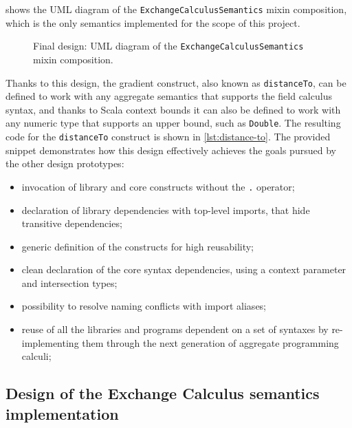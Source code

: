  shows the \ac{UML} diagram of the \texttt{ExchangeCalculusSemantics} mixin composition, which is the only semantics implemented for the scope of this project.

\begin{figure}
    \centering
    \caption{Final design: \ac{UML} diagram of the \texttt{ExchangeCalculusSemantics} mixin composition.}
    \label{fig:final-design-exchange-calculus-semantics-diagram}
    \bigskip
    \resizebox{\linewidth}{!}{
        
    }
\end{figure}

Thanks to this design, the gradient construct, also known as \texttt{distanceTo}, can be defined to work with any aggregate semantics that supports the field calculus syntax, and thanks to Scala context bounds it can also be defined to work with any numeric type that supports an upper bound, such as \texttt{Double}.
%
The resulting code for the \texttt{distanceTo} construct is shown in \cref{lst:distance-to}.
%
The provided snippet demonstrates how this design effectively achieves the goals pursued by the other design prototypes:
\begin{itemize}
    \item invocation of library and core constructs without the \texttt{.} operator;
    \item declaration of library dependencies with top-level imports, that hide transitive dependencies;
    \item generic definition of the constructs for high reusability;
    \item clean declaration of the core syntax dependencies, using a  context parameter and intersection types;
    \item possibility to resolve naming conflicts with import aliases;
    \item reuse of all the libraries and programs dependent on a set of syntaxes by re-implementing them through the next generation of aggregate programming calculi;
\end{itemize}



\subsection{Design of the Exchange Calculus semantics implementation} \label{chap:design->sec:final-dsl->subsec:exchange-calculus-semantics-design}

